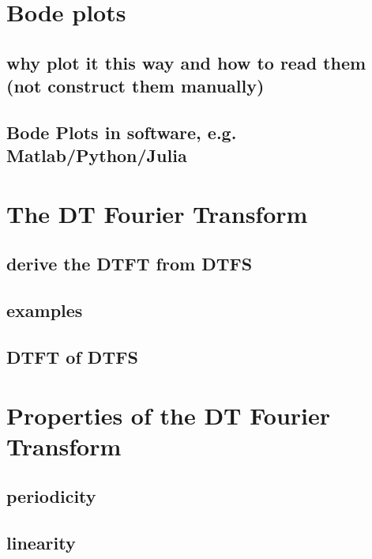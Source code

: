 \documentclass{article}
\begin{document}
\newpage
\section{Bode plots}
\label{sec:orgb48b8af}

\subsection{why plot it this way and how to read them (not construct them manually)}
\label{sec:org340c150}

\subsection{Bode Plots in software, e.g. Matlab/Python/Julia}
\label{sec:org379a762}

\newpage
\section{The DT Fourier Transform}
\label{sec:org28dd76b}

\subsection{derive the DTFT from DTFS}
\label{sec:orge003b7a}

\subsection{examples}
\label{sec:orgc5187e0}

\subsection{DTFT of DTFS}
\label{sec:orgae5f02f}

\newpage
\section{Properties of the DT Fourier Transform}
\label{sec:org4b60654}

\subsection{periodicity}
\label{sec:org561e56c}

\subsection{linearity}
\label{sec:org77a7f35}
\end{document}
